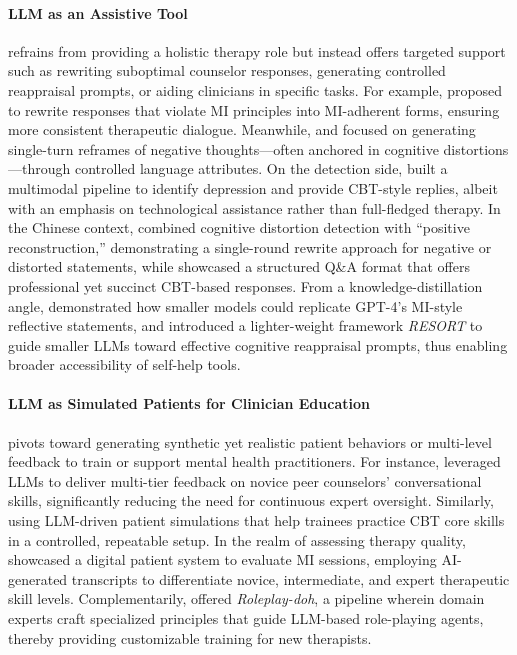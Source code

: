 \paragraph{LLM as an Assistive Tool} refrains from providing a holistic therapy role but instead offers targeted support such as rewriting suboptimal counselor responses, generating controlled reappraisal prompts, or aiding clinicians in specific tasks. For example, \citet{2} proposed to rewrite responses that violate MI principles into MI-adherent forms, ensuring more consistent therapeutic dialogue. Meanwhile, \citet{3} and \citet{5} focused on generating single-turn reframes of negative thoughts—often anchored in cognitive distortions—through controlled language attributes. On the detection side, \citet{35} built a multimodal pipeline to identify depression and provide CBT-style replies, albeit with an emphasis on technological assistance rather than full-fledged therapy. In the Chinese context, \citet{43} combined cognitive distortion detection with “positive reconstruction,” demonstrating a single-round rewrite approach for negative or distorted statements, while \citet{64} showcased a structured Q\&A format that offers professional yet succinct CBT-based responses. From a knowledge-distillation angle, \citet{70} demonstrated how smaller models could replicate GPT-4’s MI-style reflective statements, and \citet{81} introduced a lighter-weight framework \emph{RESORT} to guide smaller LLMs toward effective cognitive reappraisal prompts, thus enabling broader accessibility of self-help tools.

\paragraph{LLM as Simulated Patients for Clinician Education} pivots toward generating synthetic yet realistic patient behaviors or multi-level feedback to train or support mental health practitioners. For instance, \citet{49} leveraged LLMs to deliver multi-tier feedback on novice peer counselors’ conversational skills, significantly reducing the need for continuous expert oversight. Similarly, \citet{51} using LLM-driven patient simulations that help trainees practice CBT core skills in a controlled, repeatable setup. In the realm of assessing therapy quality, \citet{56} showcased a digital patient system to evaluate MI sessions, employing AI-generated transcripts to differentiate novice, intermediate, and expert therapeutic skill levels. Complementarily, \citet{80} offered \emph{Roleplay-doh}, a pipeline wherein domain experts craft specialized principles that guide LLM-based role-playing agents, thereby providing customizable training for new therapists.

